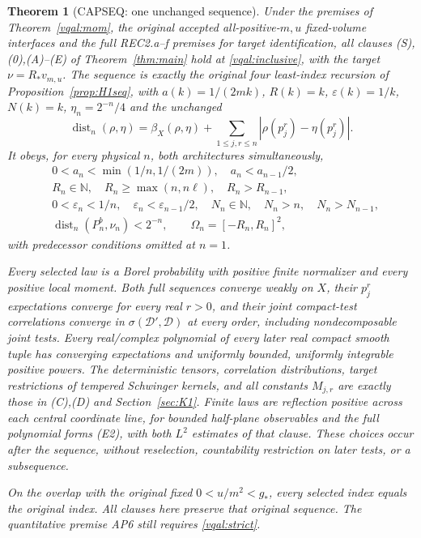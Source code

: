 \documentclass[11pt]{article}
\theoremstyle{plain}
\newtheorem{theorem}{Theorem}[section]
\theoremstyle{definition}
\theoremstyle{remark}
\newcommand{\N}{\mathbb{N}}
\newcommand{\cD}{\mathcal{D}}
\begin{document}
\begin{theorem}[CAPSEQ: one unchanged sequence]
\label{vqal:seq}
Under the premises of Theorem~\ref{vqal:mom}, the original accepted
all-positive-$m,u$ fixed-volume interfaces and the full REC2.a--f
premises for target identification, all clauses (S),(0),(A)--(E) of
Theorem~\ref{thm:main} hold at \eqref{vqal:inclusive}, with the target
$\nu=R_*v_{m,u}$. The sequence is exactly the original four least-index
recursion of Proposition~\ref{prop:H1seq}, with
$a(k)=1/(2mk)$, $R(k)=k$, $\varepsilon(k)=1/k$, $N(k)=k$,
$\eta_n=2^{-n}/4$ and the unchanged
\begin{equation}\label{vqal:dist}
 \operatorname{dist}_n(\rho,\eta)
 =\beta_X(\rho,\eta)+\sum_{1\le j,r\le n}
                    |\rho(p_j^r)-\eta(p_j^r)|.
\end{equation}
It obeys, for every physical $n$, both architectures simultaneously,
\begin{align}\label{vqal:S}
 &0<a_n<\min(1/n,1/(2m)),\quad a_n<a_{n-1}/2,\nonumber\\
 &R_n\in\N,\quad R_n\ge\max(n,n\ell),\quad R_n>R_{n-1},\nonumber\\
 &0<\varepsilon_n<1/n,\quad\varepsilon_n<\varepsilon_{n-1}/2,
 \quad N_n\in\N,\quad N_n>n,\quad N_n>N_{n-1},\nonumber\\
 &\operatorname{dist}_n(P_n^b,\nu_n)<2^{-n},\qquad
 \Omega_n=[-R_n,R_n]^2,
\end{align}
with predecessor conditions omitted at $n=1$.

Every selected law is a Borel probability with positive finite normalizer
and every positive local moment. Both full sequences converge weakly on
$X$, their $p_j^r$ expectations converge for every real $r>0$, and their
joint compact-test correlations converge in $\sigma(\cD',\cD)$ at
every order, including nondecomposable joint tests. Every real/complex
polynomial of every later real compact smooth tuple has converging
expectations and uniformly bounded, uniformly integrable positive powers.
The deterministic tensors, correlation distributions, target restrictions
of tempered Schwinger kernels, and all constants $M_{j,r}$ are exactly
those in (C),(D) and Section~\ref{sec:K1}. Finite laws are reflection
positive across each central coordinate line, for bounded half-plane
observables and the full polynomial forms (E2), with both $L^2$ estimates
of that clause. These choices occur after the sequence, without
reselection, countability restriction on later tests, or a subsequence.

On the overlap with the original fixed $0<u/m^2<g_*$, every selected
index equals the original index. All clauses here preserve that original
sequence. The quantitative premise AP6 still requires \eqref{vqal:strict}.
\end{theorem}
\end{document}
